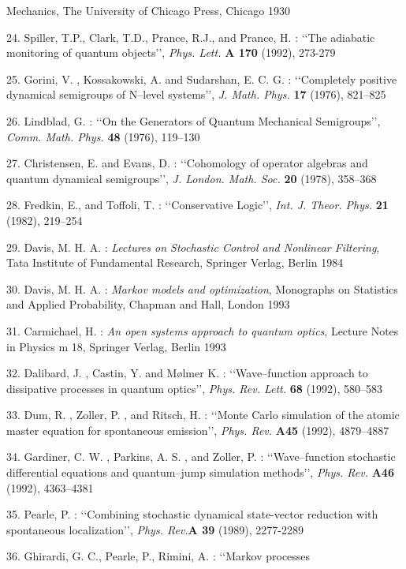 \documentclass[12pt]{article}
\def\lqq{\lq\lq}
\def\rqq{\rq\rq}
\begin{document}
\begin{description}
{Mechanics}, The University of Chicago Press, Chicago 1930
\item{24.} Spiller, T.P., Clark, T.D., Prance, R.J., and Prance, H. :
\lqq The adiabatic monitoring of quantum objects\rqq, {\sl Phys. Lett.}
{\bf A 170} (1992), 273-279
\item{25.} Gorini, V. , Kossakowski, A. and Sudarshan, E. C. G. :
\lqq Completely positive dynamical semigroups of N--level systems\rqq,
{\sl J. Math. Phys. }{\bf 17} (1976), 821--825
\item{26.} Lindblad,  G. : \lqq On the Generators of Quantum Mechanical
Semigroups\rqq, {\sl Comm. Math. Phys. }{\bf 48} (1976), 119--130
\item{27.} Christensen,  E.  and Evans,  D. : \lqq Cohomology of
operator algebras and quantum dynamical semigroups\rqq,  {\sl J.  London.
Math.  Soc. }  {\bf 20} (1978), 358--368
\item{28.} Fredkin, E., and Toffoli, T. : \lqq Conservative Logic\rqq,
{\sl Int. J. Theor. Phys.} {\bf 21} (1982), 219--254
\item{29.} Davis, M. H. A. : {\sl Lectures on Stochastic Control and
Nonlinear Filtering}, Tata Institute of Fundamental Research, Springer
Verlag, Berlin 1984
\item{30.} Davis, M. H. A. : {\sl Markov models and optimization},
Monographs on Statistics and Applied Probability, Chapman and Hall,
London 1993
\item{31.} Carmichael, H. : {\sl An open systems approach to quantum
optics}, Lecture Notes in Physics m 18, Springer Verlag, Berlin 1993
\item{32.} Dalibard, J. , Castin, Y. and M{\o}lmer K. : \lqq Wave--function
approach to dissipative processes in quantum optics\rqq, {\sl Phys. Rev.
Lett. }{\bf 68} (1992), 580--583
\item{33.} Dum, R. , Zoller, P. , and Ritsch, H. : \lqq Monte Carlo
simulation of the atomic master equation for spontaneous emission\rqq, {\sl
Phys. Rev. }{\bf A45} (1992), 4879--4887
\item{34.} Gardiner, C. W. , Parkins, A. S. , and Zoller, P. :
\lqq Wave--function stochastic differential equations and quantum--jump
simulation methods\rqq, {\sl Phys. Rev. } {\bf A46} (1992), 4363--4381
\item{35.} Pearle, P. : \lqq Combining stochastic dynamical state-vector
reduction with spontaneous localization\rqq, {\sl Phys. Rev.}{\bf A 39}
(1989), 2277-2289
\item{36.} Ghirardi, G. C., Pearle, P., Rimini, A. : \lqq  Markov processes

\end{description}
\end{document}
